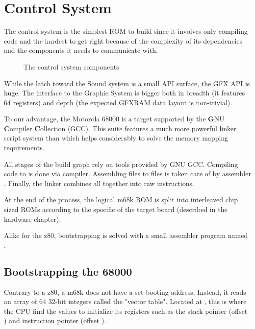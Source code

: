 \chapter{Control System}
The control system is the simplest ROM to build since it involves only compiling code and the hardest to get right because of the complexity of its dependencies and the components it needs to communicate with. 

\begin{figure}[H]
\caption*{The control system components}
\end{figure}

While the latch toward the Sound system is a small API surface, the GFX API is huge. The interface to the Graphic System is bigger both in breadth (it features 64 registers) and depth (the expected GFXRAM data layout is non-trivial).

To our advantage, the Motorola 68000 is a target supported by the \textbf{G}NU \textbf{C}ompiler \textbf{C}ollection (GCC). This suite features a much more powerful linker script system than  which helps considerably to solve the memory mapping requirements.

All stages of the build graph rely on tools provided by GNU GCC. Compiling  code to  is done via  compiler. Assembling  files to  files is taken care of by  assembler . Finally, the  linker combines all  together into raw instructions. 





At the end of the process, the logical m68k ROM is split into interleaved chip sized ROMs according to the specific of the target board (described in the hardware chapter).

 Alike for the z80, bootstrapping is solved with a small assembler program named .

\section{Bootstrapping the 68000}
Contrary to a z80, a m68k does not have a set booting address. Instead, it reads an array of 64 32-bit integers called the "vector table". Located at , this is where the CPU find the values to initialize its registers such as the stack pointer (offset ) and instruction pointer (offset ).

